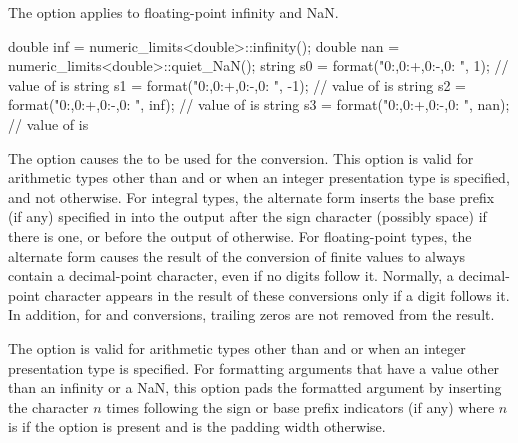 \pnum
The  option applies to floating-point infinity and NaN.
\begin{example}
\begin{codeblock}
double inf = numeric_limits<double>::infinity();
double nan = numeric_limits<double>::quiet_NaN();
string s0 = format("{0:},{0:+},{0:-},{0: }", 1);        // value of  is 
string s1 = format("{0:},{0:+},{0:-},{0: }", -1);       // value of  is 
string s2 = format("{0:},{0:+},{0:-},{0: }", inf);      // value of  is 
string s3 = format("{0:},{0:+},{0:-},{0: }", nan);      // value of  is 
\end{codeblock}
\end{example}

\pnum
The \tcode{\#} option causes the
to be used for the conversion.
This option is valid for arithmetic types other than
 and 
or when an integer presentation type is specified, and not otherwise.
For integral types,
the alternate form inserts the
base prefix (if any) specified in 
into the output after the sign character (possibly space) if there is one, or
before the output of  otherwise.
For floating-point types,
the alternate form causes the result of the conversion of finite values
to always contain a decimal-point character,
even if no digits follow it.
Normally, a decimal-point character appears in the result of these
conversions only if a digit follows it.
In addition, for  and  conversions,
trailing zeros are not removed from the result.

\pnum
The  option is valid for arithmetic types
other than  and  or
when an integer presentation type is specified.
For formatting arguments that have a value
other than an infinity or a NaN,
this option pads the formatted argument by
inserting the  character $n$ times
following the sign or base prefix indicators (if any)
where $n$ is  if the  option is present and
is the padding width otherwise.
\begin{example}
\end{example}

